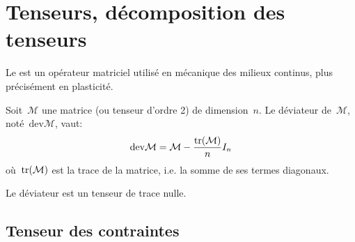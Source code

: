 \medskip
\section{Tenseurs, décomposition des tenseurs}

Le  est un opérateur matriciel utilisé en mécanique des milieux continus,
plus précisément en plasticité.

\medskip
Soit~$\mathcal{M}$ une matrice (ou tenseur d'ordre 2) de dimension~$n$.
Le déviateur de~$\mathcal{M}$, noté~$\mathrm{dev} \mathcal{M}$, vaut:
\begin{equation}  \mathrm{dev} \mathcal{M}=\mathcal{M}-\frac{\operatorname{tr}(\mathcal{M})}{n}I_n \end{equation}
où~$\operatorname{tr}(\mathcal{M})$ est la trace de la matrice, i.e. la somme de ses termes
diagonaux.

\medskip
Le déviateur est un tenseur de trace nulle.

\medskip\ifVersionDuDocEstVincent\newpage\fi
\subsection{Tenseur des contraintes}\label{Sec-TensS}

